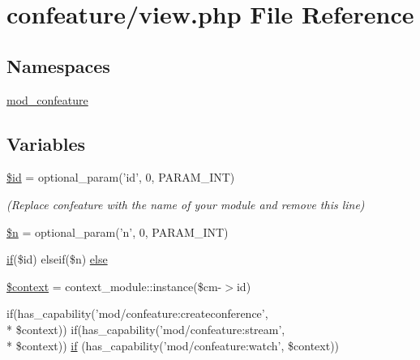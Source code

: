 \hypertarget{view_8php}{\section{confeature/view.php File Reference}
\label{view_8php}
}
\subsection*{Namespaces}
\begin{DoxyCompactItemize}
\item 
\hyperlink{namespacemod__confeature}{mod\-\_\-confeature}
\end{DoxyCompactItemize}
\subsection*{Variables}
\begin{DoxyCompactItemize}
\item 
\hyperlink{view_8php_ae97941710d863131c700f069b109991e}{\$id} = optional\-\_\-param('id', 0, P\-A\-R\-A\-M\-\_\-\-I\-N\-T)
\begin{DoxyCompactList}\small\item\em (Replace confeature with the name of your module and remove this line) \end{DoxyCompactList}\item 
\hyperlink{view_8php_aa5fae90470d460a65d5211ec08e6b05c}{\$n} = optional\-\_\-param('n', 0, P\-A\-R\-A\-M\-\_\-\-I\-N\-T)
\item 
\hyperlink{view_8php_abf65f0046bca4eaf168cd62bab83f411}{if}(\$id) elseif(\$n) \hyperlink{view_8php_a0e55d2fc7d7599dbe8a6ed40e67f653b}{else}
\item 
\hyperlink{view_8php_ae05dedb802ada0155efdece2044fed64}{\$context} = context\-\_\-module\-::instance(\$cm-\/$>$id)
\item 
if(has\-\_\-capability('mod/confeature\-:createconference', \\*
\$context)) if(has\-\_\-capability('mod/confeature\-:stream', \\*
\$context)) \hyperlink{view_8php_abf65f0046bca4eaf168cd62bab83f411}{if} (has\-\_\-capability('mod/confeature\-:watch', \$context))
\end{DoxyCompactItemize}


